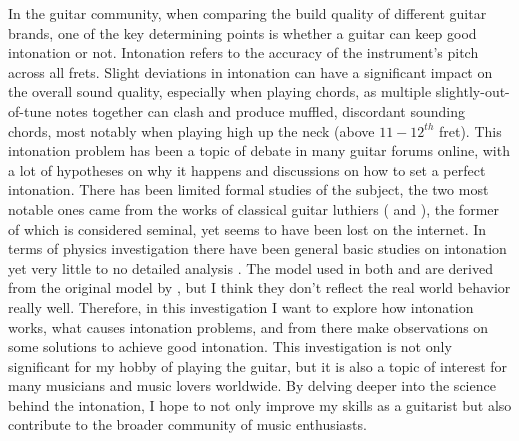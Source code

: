 In the guitar community, when comparing the build quality of different guitar brands, one of the key determining points is whether a guitar can keep good intonation or not. Intonation refers to the accuracy of the instrument’s pitch across all frets. Slight deviations in intonation can have a significant impact on the overall sound quality, especially when playing chords, as multiple slightly-out-of-tune notes together can clash and produce muffled, discordant sounding chords, most notably when playing high up the neck (above $11-12^{th}$ fret). This intonation problem has been a topic of debate in many guitar forums online, with a lot of hypotheses on why it happens and discussions on how to set a perfect intonation. There has been limited formal studies of the subject, the two most notable ones came from the works of classical guitar luthiers (\cite{bartolinis} and \cite{byers}), the former of which is considered seminal, yet seems to have been lost on the internet. In terms of physics investigation there have been general basic studies on intonation yet very little to no detailed analysis \cite{varieschi}. The model used in both \cite{byers} and \cite{varieschi} are derived from the original model by \cite{bartolinis}, but I think they don't reflect the real world behavior really well. Therefore, in this investigation I want to explore how intonation works, what causes intonation problems, and from there make observations on some solutions to achieve good intonation. This investigation is not only significant for my hobby of playing the guitar, but it is also a topic of interest for many musicians and music lovers worldwide. By delving deeper into the science behind the intonation, I hope to not only improve my skills as a guitarist but also contribute to the broader community of music enthusiasts.